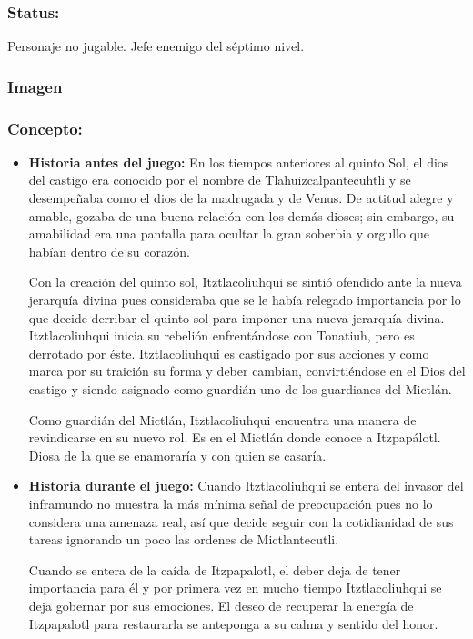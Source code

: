 \documentclass[11pt,letterpaper]{article}
\begin{document}
\subsubsection{Status:}
Personaje no jugable.
Jefe enemigo del séptimo nivel.	  
\subsubsection{Imagen}
\subsubsection{Concepto:}
\begin{itemize}
	\item \textbf{Historia antes del juego:}
	En los tiempos anteriores al quinto Sol, el dios del castigo era conocido por el nombre de Tlahuizcalpantecuhtli y se desempeñaba como el dios de la madrugada y de Venus. De actitud alegre y amable, gozaba de una buena relación con los demás dioses; sin embargo, su amabilidad era una pantalla para ocultar la gran soberbia y orgullo que habían dentro de su corazón.
	\\
	\par
	Con la creación del quinto sol, Itztlacoliuhqui se sintió ofendido ante la nueva jerarquía divina pues consideraba que se le había relegado importancia por lo que decide derribar el quinto sol para imponer una nueva jerarquía divina.  Itztlacoliuhqui inicia su rebelión enfrentándose con Tonatiuh, pero es derrotado por éste.  Itztlacoliuhqui es castigado por sus acciones y como marca por su traición su forma y deber cambian, convirtiéndose en el Dios del castigo y siendo asignado como guardián uno de los guardianes del Mictlán.
	\\
	\par
	Como guardián del Mictlán,  Itztlacoliuhqui encuentra una manera de revindicarse en su nuevo rol. Es en el Mictlán donde conoce a Itzpapálotl. Diosa de la que se enamoraría y con quien se casaría.
	\item \textbf{Historia durante el juego:}
	Cuando Itztlacoliuhqui se entera del invasor del inframundo no muestra la más mínima señal de preocupación pues no lo considera una amenaza real, así que decide seguir con la cotidianidad de sus tareas ignorando un poco las ordenes de Mictlantecutli.
	\\
	\par
	Cuando se entera de la caída de Itzpapalotl, el deber deja de tener importancia para él y por primera vez en mucho tiempo Itztlacoliuhqui se deja gobernar por sus emociones. El deseo de recuperar la energía de Itzpapalotl para restaurarla se anteponga a su calma y sentido del honor.

\end{itemize}
\end{document}
